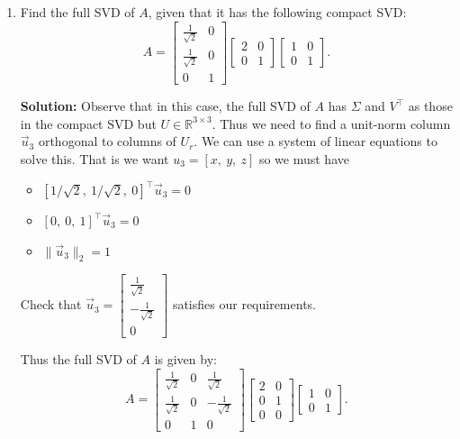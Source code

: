 \documentclass[10pt]{article}
\newcommand{\RR}{\mathbb{R}}
\begin{document}
\begin{enumerate}[label=(\alph*)]
\textbf{Solution:} The compact SVD of $A$ is given by:
\[
A = \begin{bmatrix} 0 \\ 1 \\ 0 \end{bmatrix} \begin{bmatrix} 2 \end{bmatrix} \begin{bmatrix} 1 & 0 \end{bmatrix}.
\]

\item Find the full SVD of $A$, given that it has the following compact SVD:
\[
A = \begin{bmatrix} \frac{1}{\sqrt{2}} & 0 \\[4pt] \frac{1}{\sqrt{2}} & 0 \\[4pt] 0 & 1 \end{bmatrix} \begin{bmatrix} 2 & 0 \\ 0 & 1 \end{bmatrix} \begin{bmatrix} 1 & 0 \\ 0 & 1 \end{bmatrix}.
\]

\textbf{Solution:} Observe that in this case, the full SVD of $A$ has $\Sigma$ and $V^\top$ as those in the compact SVD but $U \in \RR^{3 \times 3}$. Thus we need to find a unit-norm column $\vec{u}_3$ orthogonal to columns of $U_r$. We can use a system of linear equations to solve this. That is we want $u_3 = [x,\ y,\ z]$ so we must have
\begin{itemize}
    \item $[1/\sqrt{2},\ 1/\sqrt{2},\ 0]^\top \vec{u}_3 = 0$
    \item $[0,\ 0,\ 1]^\top \vec{u}_3 = 0$
    \item $\|\vec{u}_3\|_2 = 1$
\end{itemize}

Check that $\vec{u}_3 = \begin{bmatrix} \frac{1}{\sqrt{2}} \\[4pt] -\frac{1}{\sqrt{2}} \\[4pt] 0 \end{bmatrix}$ satisfies our requirements.

Thus the full SVD of $A$ is given by:
\[
A = \begin{bmatrix} \frac{1}{\sqrt{2}} & 0 & \frac{1}{\sqrt{2}} \\[4pt] \frac{1}{\sqrt{2}} & 0 & -\frac{1}{\sqrt{2}} \\[4pt] 0 & 1 & 0 \end{bmatrix} \begin{bmatrix} 2 & 0 \\ 0 & 1 \\ 0 & 0 \end{bmatrix} \begin{bmatrix} 1 & 0 \\ 0 & 1 \end{bmatrix}.
\]


\end{enumerate}
\end{document}
